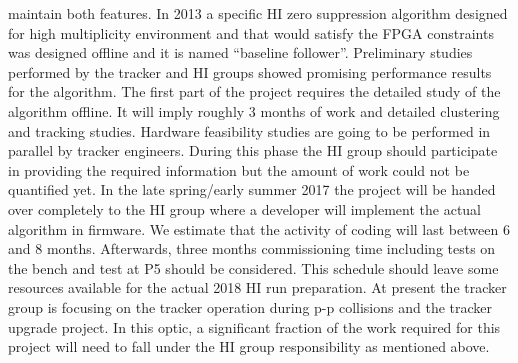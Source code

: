 maintain both features. In 2013 a specific HI zero suppression algorithm designed for high multiplicity environment and
that would satisfy the FPGA constraints was designed offline and it is named “baseline follower”.  Preliminary studies
performed by the tracker and HI groups showed promising performance results for the algorithm. The first part of the
project requires the detailed study of the algorithm offline. It will imply roughly 3 months of work and detailed
clustering and tracking studies. Hardware feasibility studies are going to be performed in parallel by tracker
engineers. During this phase the HI group should participate in providing the required information but the amount of
work could not be quantified yet. In the late spring/early summer 2017 the project will be handed over completely to the
HI group where a developer will implement the actual algorithm in firmware. We estimate that the activity of coding will
last between 6 and 8 months. Afterwards, three months commissioning time including tests on the bench and test at P5
should be considered. This schedule should leave some resources available for the actual 2018 HI run preparation. At
present the tracker group is focusing on the tracker operation during p-p collisions and the tracker upgrade project. In
this optic, a significant fraction of the work required for this project will need to fall under the HI group
responsibility as mentioned above. 


